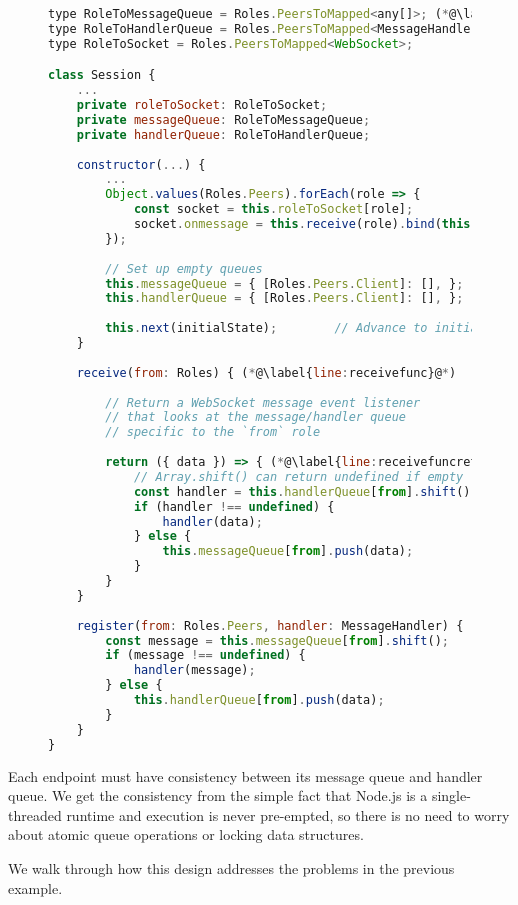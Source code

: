 \begin{figure}[!h]
\begin{lstlisting}[language=javascript,tabsize=2]
type RoleToMessageQueue = Roles.PeersToMapped<any[]>; (*@\label{line:mapped1}@*)
type RoleToHandlerQueue = Roles.PeersToMapped<MessageHandler[]>; (*@\label{line:mapped2}@*)
type RoleToSocket = Roles.PeersToMapped<WebSocket>;

class Session {
	...
	private roleToSocket: RoleToSocket;
	private messageQueue: RoleToMessageQueue;
	private handlerQueue: RoleToHandlerQueue;
	
	constructor(...) {
		...
		Object.values(Roles.Peers).forEach(role => {
			const socket = this.roleToSocket[role];
			socket.onmessage = this.receive(role).bind(this);
		});
		
		// Set up empty queues
		this.messageQueue = { [Roles.Peers.Client]: [], }; (*@\label{line:queue1}@*)
		this.handlerQueue = { [Roles.Peers.Client]: [], }; (*@\label{line:queue2}@*)
		
		this.next(initialState);		// Advance to initial state
	}
	
	receive(from: Roles) { (*@\label{line:receivefunc}@*)
	
		// Return a WebSocket message event listener
		// that looks at the message/handler queue
		// specific to the `from` role
		
		return ({ data }) => { (*@\label{line:receivefuncret}@*)
			// Array.shift() can return undefined if empty
			const handler = this.handlerQueue[from].shift();
			if (handler !== undefined) {
				handler(data);
			} else {
				this.messageQueue[from].push(data);			
			}
		}
	}
	
	register(from: Roles.Peers, handler: MessageHandler) { (*@\label{line:newregister}@*)
		const message = this.messageQueue[from].shift();
		if (message !== undefined) {
			handler(message);		
		} else {
			this.handlerQueue[from].push(data);		
		}
	}
}
\end{lstlisting}
\label{lst:nodesession}
\end{figure}

Each endpoint must have consistency between
its message queue and handler queue.
We get the consistency from the simple fact that Node.js 
is a single-threaded runtime and execution is never pre-empted,
so there is no need to worry about atomic queue operations or
locking data structures.

We walk through how this design addresses the problems
in the previous example.

